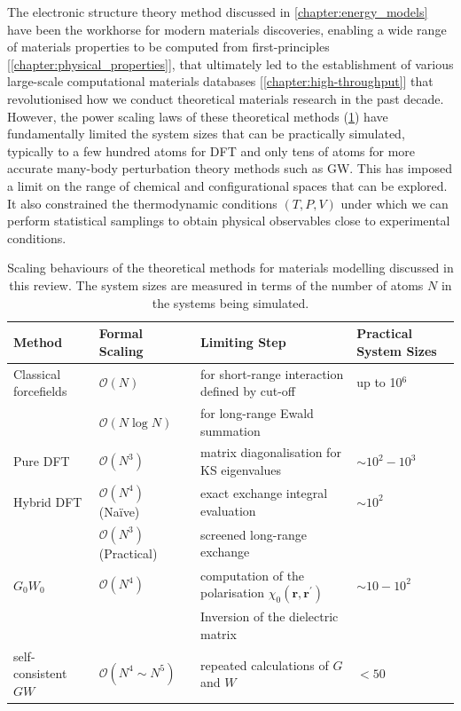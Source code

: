 The electronic structure theory method discussed in \cref{chapter:energy_models} have been the workhorse for modern materials discoveries, enabling a wide range of materials properties to be computed from first-principles [\cref{chapter:physical_properties}], that ultimately led to the establishment of various large-scale computational materials databases [\cref{chapter:high-throughput}] that revolutionised how we conduct theoretical materials research in the past decade. However, the power scaling laws of these theoretical methods (\cref{tab:scaling_low}) have fundamentally limited the system sizes that can be practically simulated, typically to a few hundred atoms for DFT and only tens of atoms for more accurate many-body perturbation theory methods such as GW. This has imposed a limit on the range of chemical and configurational spaces that can be explored. It also constrained the thermodynamic conditions $(T, P, V)$ under which we can perform statistical samplings to obtain physical observables close to experimental conditions. 

\begin{table}[htb]
    \centering
    \caption{Scaling behaviours of the theoretical methods for materials modelling discussed in this review. The system sizes are measured in terms of the number of atoms $N$ in the systems being simulated.}
    \label{tab:scaling_low}
    \begin{tabular}{llll}
    \hline\hline 
    \textbf{Method} & \textbf{Formal Scaling} & \textbf{Limiting Step} & \textbf{Practical System Sizes} \\
    \hline
    Classical forcefields & $\mathcal{O}(N)$ & for short-range interaction defined by cut-off & up to 10$^6$ \\
                         & $\mathcal{O}(N\log N)$ & for long-range Ewald summation & \\
    Pure DFT  & $\mathcal{O}(N^3)$ & matrix diagonalisation for KS eigenvalues & $\sim 10^{2}-10^{3}$\\
    Hybrid DFT  & $\mathcal{O}(N^4)$ (Na\"{i}ve) & exact exchange integral evaluation & $\sim 10^{2}$ \\
                & $\mathcal{O}(N^3)$ (Practical) & screened long-range exchange & \\
    $G_{0}W_{0}$ & $\mathcal{O}(N^4)$ & computation of the polarisation $\chi_0(\bm{r},\bm{r}^\prime)$ & $\sim 10-10^{2}$ \\
                                   && Inversion of the dielectric matrix &\\
    self-consistent $GW$ & $\mathcal{O}(N^4\sim N^5)$ & repeated calculations of $G$ and $W$ & $<50$ \\
    \hline\hline
    \end{tabular}
\end{table}

